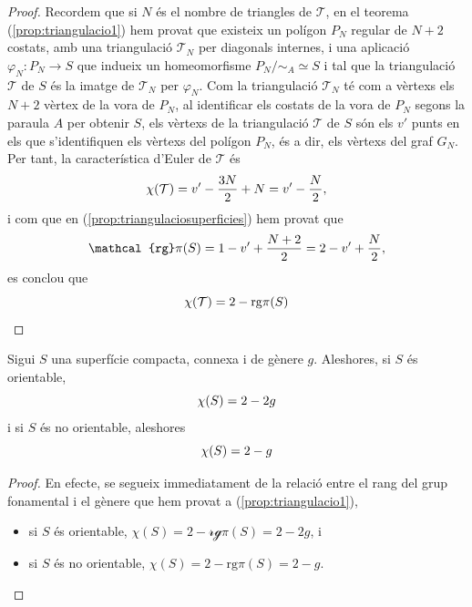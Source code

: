 \documentclass[../main.tex]{subfiles}
\begin{document}
\begin{proof}
Recordem que si $N$ és el nombre de triangles de $\mathcal{T}$, en el teorema (\ref{prop:triangulacio1}) hem provat que existeix un polígon $P_N$ regular de $N+2$ costats, amb una triangulació $\mathcal{T}_N$ per diagonals internes, i una aplicació $\varphi_N:P_N\rightarrow S$ que indueix un homeomorfisme $P_N/\sim_A\simeq S$ i tal que la triangulació $\mathcal{T}$ de $S$ és la imatge de $\mathcal{T}_N$ per $\varphi_N$. Com la triangulació $\mathcal{T}_N$ té com a vèrtexs els $N+2$ vèrtex de la vora de $P_N$, al identificar els costats de la vora de $P_N$ segons la paraula $A$ per obtenir $S$, els vèrtexs de la triangulació $\mathcal{T}$ de $S$ són els $v'$ punts en els que s'identifiquen els vèrtexs del polígon $P_N$, és a dir, els vèrtexs del graf $G_N$. Per tant, la característica d'Euler de $\mathcal{T}$ és
\begin{equation}
    \notag
    \chi(\mathcal{T}) = v'-\frac{3N}{2}+N=v'-\frac{N}{2},
\end{equation}
i com que en (\ref{prop:triangulaciosuperficies}) hem provat que 
\begin{equation}
    \notag
    \mathcal{rg}\pi(S)=1-v'+\frac{N+2}{2} = 2-v' + \frac{N}{2},
\end{equation}
es conclou que 
\begin{equation}
    \notag
    \chi(\mathcal{T})=2-\mathrm{rg}\pi(S)
\end{equation}
\end{proof}



\begin{coro}
\label{coro:caracteristicaeulerorientabilitat} Sigui $S$ una superfície compacta, connexa i de gènere $g$. Aleshores, si $S$ és orientable,
\begin{equation}
    \notag
    \chi(S) = 2-2g
\end{equation}
i si $S$ és no orientable, aleshores 
\begin{equation}
    \notag
    \chi(S) = 2-g
\end{equation}
\end{coro}
\begin{proof}
En efecte, se segueix immediatament de la relació entre el rang del grup fonamental i el gènere que hem provat a (\ref{prop:triangulacio1}),
\begin{itemize}
    \item si $S$ és orientable, $\chi(S) = 2-\mathcal{rg}\pi(S) = 2-2g$, i
    \item si $S$ és no orientable, $\chi(S) = 2-\mathrm{rg}\pi(S) = 2-g$.
\end{itemize}
\end{proof}
\end{document}
